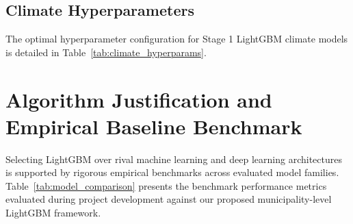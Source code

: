 \documentclass[journal,onecolumn,11pt]{IEEEtran}
\begin{document}
\subsection{Climate Hyperparameters}
The optimal hyperparameter configuration for Stage 1 LightGBM climate models is detailed in Table~\ref{tab:climate_hyperparams}.

\begin{table}[h!]
\centering
\caption{Hyperparameter Setup for Climate LightGBM Regressors}
\label{tab:climate_hyperparams}
\end{table}

\section{Algorithm Justification and Empirical Baseline Benchmark}

Selecting LightGBM over rival machine learning and deep learning architectures is supported by rigorous empirical benchmarks across evaluated model families. Table~\ref{tab:model_comparison} presents the benchmark performance metrics evaluated during project development against our proposed municipality-level LightGBM framework.
\end{document}
